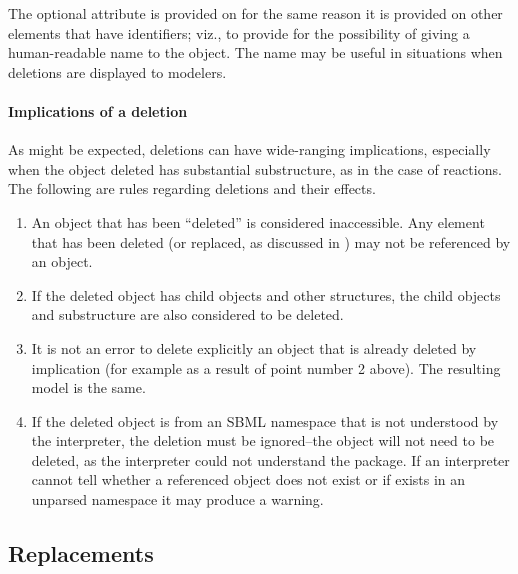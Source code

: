 The optional  attribute is provided on \Deletion for the
same reason it is provided on other elements that have identifiers;
viz., to provide for the possibility of giving a human-readable name to
the object.  The name may be useful in situations when deletions are
displayed to modelers.


\paragraph{Implications of a deletion}

As might be expected, deletions can have wide-ranging implications,
especially when the object deleted has substantial substructure, as in
the case of reactions.  The following are rules regarding deletions and
their effects.

\begin{enumerate}

\item An object that has been ``deleted'' is considered inaccessible.
  Any element that has been deleted (or replaced, as discussed in
  ) may not be referenced by an \SBaseRef object.

\item If the deleted object has child objects and other structures, the
  child objects and substructure are also considered to be deleted.

\item It is not an error to delete explicitly an object that is already
  deleted by implication (for example as a result of point number 2
  above).  The resulting model is the same.

\item If the deleted object is from an SBML namespace that is not
  understood by the interpreter, the deletion must be ignored--the 
  object will not need to be deleted, as the interpreter could not
  understand the package.  If an interpreter cannot tell whether 
  a referenced object does not exist or if exists in an unparsed namespace
  it may produce a warning.

\end{enumerate}



\subsection{Replacements}
\label{replacements}
\label{extended-sbase-class}

